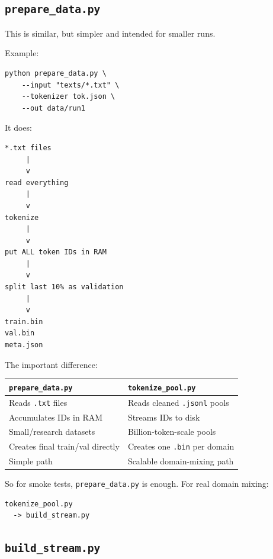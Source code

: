 \subsection{\texttt{prepare\_data.py}}

This is similar, but simpler and intended for smaller runs.

Example:
\begin{lstlisting}[style=shadedpython]
python prepare_data.py \
    --input "texts/*.txt" \
    --tokenizer tok.json \
    --out data/run1
\end{lstlisting}

It does:
\begin{lstlisting}[style=shadedpython,language={},basicstyle=\scriptsize\ttfamily]
*.txt files
     |
     v
read everything
     |
     v
tokenize
     |
     v
put ALL token IDs in RAM
     |
     v
split last 10% as validation
     |
     v
train.bin
val.bin
meta.json
\end{lstlisting}

The important difference:
\begin{center}
  \renewcommand{\arraystretch}{1.15}
  \small
  \begin{tabular}{@{}p{}p{}@{}}
    \textbf{\texttt{prepare\_data.py}} &
    \textbf{\texttt{tokenize\_pool.py}} \\
    \hline
    Reads \texttt{.txt} files &
    Reads cleaned \texttt{.jsonl} pools \\
    Accumulates IDs in RAM &
    Streams IDs to disk \\
    Small/research datasets &
    Billion-token-scale pools \\
    Creates final train/val directly &
    Creates one \texttt{.bin} per domain \\
    Simple path &
    Scalable domain-mixing path
  \end{tabular}
\end{center}

So for smoke tests, \texttt{prepare\_data.py} is enough. For real domain
mixing:
\begin{lstlisting}[style=shadedpython,language={},basicstyle=\scriptsize\ttfamily]
tokenize_pool.py
  -> build_stream.py
\end{lstlisting}

\subsection{\texttt{build\_stream.py}}

